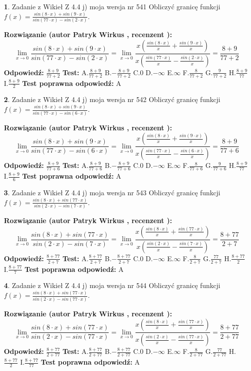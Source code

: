 \documentclass[12pt, a4paper]{article}
\theoremstyle{definition} %
\newtheorem{zad}{}
\newcommand{\zadStart}[1]{\begin{zad}#1\newline}
\newcommand{\zadStop}{\end{zad}}
\newcommand{\rozwStart}[2]{\noindent \textbf{Rozwiązanie (autor #1 , recenzent #2): }\newline}
\newcommand{\rozwStop}{\newline}
\newcommand{\odpStart}{\noindent \textbf{Odpowiedź:}\newline}
\newcommand{\odpStop}{\newline}
\newcommand{\testStart}{\noindent \textbf{Test:}\newline}
\newcommand{\testStop}{\newline}
\newcommand{\kluczStart}{\noindent \textbf{Test poprawna odpowiedź:}\newline}
\newcommand{\kluczStop}{\newline}
\begin{document}
\zadStart{Zadanie z Wikieł Z 4.4 j) moja wersja nr 541}
Obliczyć granicę funkcji $f(x)=\frac{sin(8\cdot x) +sin(9\cdot x)}{sin(77\cdot x) -sin(2\cdot x)}$.
\zadStop
\rozwStart{Patryk Wirkus}{}
$$\lim\limits_{x\to 0}\frac{sin(8\cdot x) +sin(9\cdot x)}{sin(77\cdot x) -sin(2\cdot x)}=\lim\limits_{x\to 0}\frac{x(\frac{sin(8\cdot x)}{x}+\frac{sin(9\cdot x)}{x})}{x(\frac{sin(77\cdot x)}{x}-\frac{sin(2\cdot x)}{x})}=\frac{8+9}{77+2}$$
\rozwStop
\odpStart
$\frac{8+9}{77+2}$
\odpStop
\testStart
A.$\frac{8+9}{77+2}$
B.$-\frac{8+9}{77+2}$
C.$0$
D.$-\infty$
E.$\infty$
F.$\frac{8}{77+2}$
G.$\frac{9}{77+2}$
H.$\frac{8+9}{77}$
I.$\frac{8+9}{2}$
\testStop
\kluczStart
A
\kluczStop



\zadStart{Zadanie z Wikieł Z 4.4 j) moja wersja nr 542}
Obliczyć granicę funkcji $f(x)=\frac{sin(8\cdot x) +sin(9\cdot x)}{sin(77\cdot x) -sin(6\cdot x)}$.
\zadStop
\rozwStart{Patryk Wirkus}{}
$$\lim\limits_{x\to 0}\frac{sin(8\cdot x) +sin(9\cdot x)}{sin(77\cdot x) -sin(6\cdot x)}=\lim\limits_{x\to 0}\frac{x(\frac{sin(8\cdot x)}{x}+\frac{sin(9\cdot x)}{x})}{x(\frac{sin(77\cdot x)}{x}-\frac{sin(6\cdot x)}{x})}=\frac{8+9}{77+6}$$
\rozwStop
\odpStart
$\frac{8+9}{77+6}$
\odpStop
\testStart
A.$\frac{8+9}{77+6}$
B.$-\frac{8+9}{77+6}$
C.$0$
D.$-\infty$
E.$\infty$
F.$\frac{8}{77+6}$
G.$\frac{9}{77+6}$
H.$\frac{8+9}{77}$
I.$\frac{8+9}{6}$
\testStop
\kluczStart
A
\kluczStop



\zadStart{Zadanie z Wikieł Z 4.4 j) moja wersja nr 543}
Obliczyć granicę funkcji $f(x)=\frac{sin(8\cdot x) +sin(77\cdot x)}{sin(2\cdot x) -sin(7\cdot x)}$.
\zadStop
\rozwStart{Patryk Wirkus}{}
$$\lim\limits_{x\to 0}\frac{sin(8\cdot x) +sin(77\cdot x)}{sin(2\cdot x) -sin(7\cdot x)}=\lim\limits_{x\to 0}\frac{x(\frac{sin(8\cdot x)}{x}+\frac{sin(77\cdot x)}{x})}{x(\frac{sin(2\cdot x)}{x}-\frac{sin(7\cdot x)}{x})}=\frac{8+77}{2+7}$$
\rozwStop
\odpStart
$\frac{8+77}{2+7}$
\odpStop
\testStart
A.$\frac{8+77}{2+7}$
B.$-\frac{8+77}{2+7}$
C.$0$
D.$-\infty$
E.$\infty$
F.$\frac{8}{2+7}$
G.$\frac{77}{2+7}$
H.$\frac{8+77}{2}$
I.$\frac{8+77}{7}$
\testStop
\kluczStart
A
\kluczStop



\zadStart{Zadanie z Wikieł Z 4.4 j) moja wersja nr 544}
Obliczyć granicę funkcji $f(x)=\frac{sin(8\cdot x) +sin(77\cdot x)}{sin(2\cdot x) -sin(77\cdot x)}$.
\zadStop
\rozwStart{Patryk Wirkus}{}
$$\lim\limits_{x\to 0}\frac{sin(8\cdot x) +sin(77\cdot x)}{sin(2\cdot x) -sin(77\cdot x)}=\lim\limits_{x\to 0}\frac{x(\frac{sin(8\cdot x)}{x}+\frac{sin(77\cdot x)}{x})}{x(\frac{sin(2\cdot x)}{x}-\frac{sin(77\cdot x)}{x})}=\frac{8+77}{2+77}$$
\rozwStop
\odpStart
$\frac{8+77}{2+77}$
\odpStop
\testStart
A.$\frac{8+77}{2+77}$
B.$-\frac{8+77}{2+77}$
C.$0$
D.$-\infty$
E.$\infty$
F.$\frac{8}{2+77}$
G.$\frac{77}{2+77}$
H.$\frac{8+77}{2}$
I.$\frac{8+77}{77}$
\testStop
\kluczStart
A
\kluczStop
\end{document}
